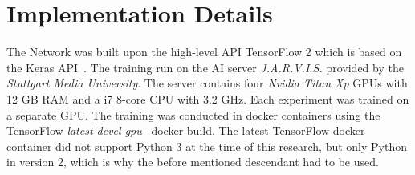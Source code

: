 \section{Implementation Details}
The Network was built upon the high-level API TensorFlow 2 which is based on the Keras API~\cite{tensorflow2}.
The training run on the AI server \textit{J.A.R.V.I.S.} provided by the \textit{Stuttgart Media University}.
The server contains four \textit{Nvidia Titan Xp} GPUs with 12 GB RAM and a i7 8-core CPU with 3.2 GHz.
Each experiment was trained on a separate GPU. The training was conducted in docker containers using the TensorFlow
\textit{latest-devel-gpu}~\cite{tensorflowdocker} docker build.
The latest TensorFlow docker container did not support Python 3 at the time of this research, but only Python in version
2, which is why the before mentioned descendant had to be used.


